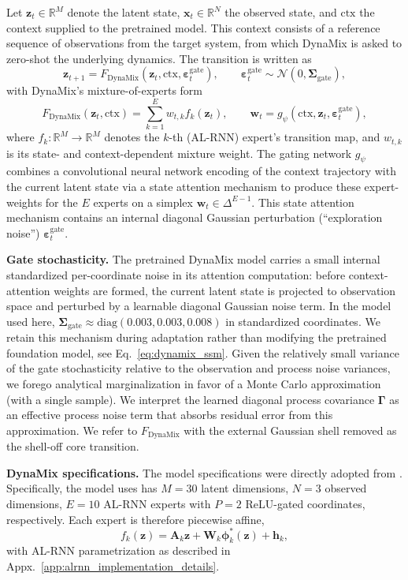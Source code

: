 \documentclass{article}
\theoremstyle{plain}
\theoremstyle{definition}
\theoremstyle{remark}
\newcommand{\R}{\mathbb{R}}
\begin{document}
Let $\bm z_t\in\R^M$ denote the latent state, $\bm x_t\in\R^N$ the observed state, and $\mathrm{ctx}$ the context supplied to the pretrained model. This context consists of a reference sequence of observations from the target system, from which DynaMix is asked to zero-shot the underlying dynamics. The transition is written as
\[
\bm z_{t+1}=F_{\mathrm{DynaMix}}(\bm z_t,\mathrm{ctx}, \bm\varepsilon_t^{\mathrm{gate}}), \qquad \bm \varepsilon_t^\mathrm{gate} \sim \mathcal{N}(0,\bm \Sigma_\mathrm{gate}),
\]
with DynaMix's mixture-of-experts form
\[
F_{\mathrm{DynaMix}}(\bm z_t,\mathrm{ctx})
=
\sum_{k=1}^{E} w_{t,k} f_k(\bm z_t), \qquad \bm w_t=g_{\psi}(\mathrm{ctx},\bm z_t,\bm\varepsilon_t^{\mathrm{gate}}),
\]
where $f_k:\mathbb R^M\to\mathbb R^M$ denotes the $k$-th (AL-RNN) expert's transition map, and $w_{t,k}$ is its state- and context-dependent mixture weight. The gating network $g_{\psi}$ combines a convolutional neural network encoding of the context trajectory with the current latent state via a state attention mechanism to produce these expert-weights for the $E$ experts on a simplex $\bm w_t\in\Delta^{E-1}$. This state attention mechanism contains an internal diagonal Gaussian perturbation (``exploration noise'') $\bm \varepsilon^{\mathrm{gate}}_t$.

\textbf{Gate stochasticity.}
The pretrained DynaMix model carries a small internal standardized per-coordinate noise in its attention computation: before context-attention weights are formed, the current latent state is projected to observation space and perturbed by a learnable diagonal Gaussian noise term. In the model used here,
$\bm{\Sigma}_\mathrm{gate} \approx \mathrm{diag}(0.003, 0.003, 0.008)$ in standardized coordinates. We retain this mechanism during adaptation rather than modifying the pretrained foundation model, see Eq.~\ref{eq:dynamix_ssm}. Given the relatively small variance of the gate stochasticity relative to the observation and process noise variances, we forego analytical marginalization in favor of a Monte Carlo approximation (with a single sample). We interpret the learned diagonal process covariance $\bm\Gamma$ as an effective process noise term that absorbs residual error from this approximation.
We refer to $F_{\mathrm{DynaMix}}$ with the external Gaussian shell removed as the shell-off core transition.

\textbf{DynaMix specifications.} The model specifications were directly adopted from \cite{hemmer2025true}. Specifically, the model uses has $M=30$ latent dimensions, $N=3$ observed dimensions, $E=10$ AL-RNN experts with $P=2$ ReLU-gated coordinates, respectively. Each expert is therefore piecewise affine,
\[
f_k(\bm z)=\bm A_k\bm z+\bm W_k\bm\phi_k^\ast(\bm z)+\bm h_k,
\]
with AL-RNN parametrization as described in Appx.~\ref{app:alrnn_implementation_details}.
\end{document}
